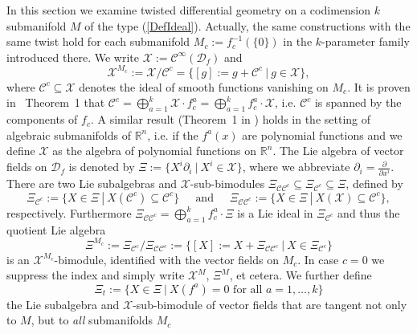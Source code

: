 \documentclass[a4paper,11pt]{article}
\begin{document}
In this section we examine twisted differential geometry on a codimension $k$ submanifold $M$ of  the type (\ref{DefIdeal}). 
Actually, the same constructions with the same twist hold for each submanifold  $M_c:=f_c^{-1}(\{0\})$  in the
$k$-parameter family introduced there.
We write $\mathcal{X}:=\mathcal{C}^\infty(\mathcal{D}_f)$ and
\begin{equation}
    \mathcal{X}^{M_c}:=\mathcal{X}/\mathcal{C}^c
    =\{[g]:=g+\mathcal{C}^c~|~g\in\mathcal{X}\},
\end{equation}
where $\mathcal{C}^c\subseteq\mathcal{X}$ denotes the ideal of smooth functions 
vanishing on $M_c$. It is proven in \cite{FioreWeber}~Theorem~1 that $\mathcal{C}^c
=\bigoplus_{a=1}^k\mathcal{X}\cdot f^a_c=\bigoplus_{a=1}^kf^a_c\cdot\mathcal{X}$, i.e. $\mathcal{C}^c$ is spanned by the components of $f_c$. A similar result (Theorem~1 in \cite{FioFraWebquadrics}) holds in the setting of algebraic submanifolds of  
$\mathbb{R}^n$, i.e. if the $f^a(x)$ are polynomial functions and we define  $\mathcal{X}$ as the algebra
of polynomial functions on $\mathbb{R}^n$.
The Lie algebra
of vector fields on $\mathcal{D}_f$ is denoted by
$\Xi:=\{X^i\partial_i~|~X^i\in\mathcal{X}\}$, where we abbreviate $\partial_i
=\frac{\partial}{\partial x^i}$. There are two Lie subalgebras and 
$\mathcal{X}$-sub-bimodules $\Xi_{\mathcal{C}\mathcal{C}^c}\subseteq\Xi_{\mathcal{C}^c}
\subseteq\Xi$, defined by
\begin{equation}
    \Xi_{\mathcal{C}^c}:=\{X\in\Xi~|~X(\mathcal{C}^c)\subseteq\mathcal{C}^c\}~~~~~
    \text{ and }~~~~~
    \Xi_{\mathcal{C}\mathcal{C}^c}:=\{X\in\Xi~|~X(\mathcal{X})\subseteq\mathcal{C}^c\},
\end{equation}
respectively. Furthermore $\Xi_{\mathcal{C}\mathcal{C}^c}=\bigoplus_{a=1}^kf^a_c\cdot\Xi$
is a Lie ideal in $\Xi_{\mathcal{C}^c}$ and thus the quotient Lie algebra
\begin{equation}
    \Xi^{M_c}:=\Xi_{\mathcal{C}^c}/\Xi_{\mathcal{C}\mathcal{C}^c}
    :=\{[X]:=X+\Xi_{\mathcal{C}\mathcal{C}^c}~|~X\in\Xi_{\mathcal{C}^c}\}
\end{equation}
is an $\mathcal{X}^{M_c}$-bimodule, identified with the vector fields on $M_c$.
In case $c=0$ we suppress the index and simply write $\mathcal{X}^M$, $\Xi^M$,
et cetera. We further define
\begin{equation}
    \Xi_t:=\{X\in\Xi~|~X(f^a)=0\text{ for all }a=1,\ldots,k\}
\end{equation}
the Lie subalgebra and $\mathcal{X}$-sub-bimodule of vector fields that are tangent not only to $M$, but to \textit{all} submanifolds $M_c$
\end{document}
